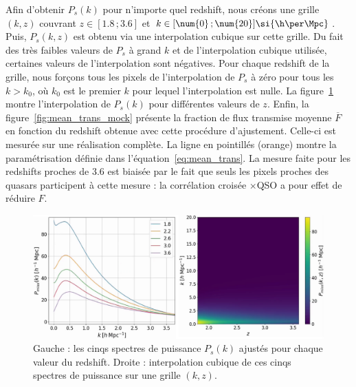 Afin d'obtenir $P_{s}(k)$ pour n'importe quel redshift, nous créons une grille $(k, z)$ couvrant $z \in [\num{1.8} \, ; \num{3.6}]$ et $k \in [\num{0} \, ; \num{20}] \si{\h\per\Mpc}$.
Puis, $P_{s}(k,z)$ est obtenu via une interpolation cubique sur cette grille. Du fait des très faibles valeurs de $P_{s}$ à grand $k$ et de l'interpolation cubique utilisée, certaines valeurs de l'interpolation sont négatives. Pour chaque redshift de la grille, nous forçons tous les pixels de l'interpolation de $P_{s}$ à zéro pour tous les $k > k_0$, où $k_0$ est le premier $k$ pour lequel l'interpolation est nulle. La figure~\ref{fig:p1dmiss} montre l'interpolation de $P_{s}(k)$ pour différentes valeurs de $z$.
Enfin, la figure~\ref{fig:mean_trans_mock} présente la fraction de flux transmise moyenne $\overline F$ en fonction du redshift obtenue avec cette procédure d'ajustement. Celle-ci est mesurée sur une réalisation complète. La ligne en pointillés (orange) montre la paramétrisation définie dans l'équation~\ref{eq:mean_trans}. La mesure faite pour les redshifts proches de \num{3.6} est biaisée par le fait que seuls les pixels proches des quasars participent à cette mesure : la corrélation croisée \lya{}$\times$QSO a pour effet de réduire $F$.
\begin{figure}
  \centering
  \includegraphics[scale=0.4]{p1dmiss}
  \caption{Gauche : les cinqs spectres de puissance $P_{s}(k)$ ajustés pour chaque valeur du redshift. Droite : interpolation cubique de ces cinqs spectres de puissance sur une grille $(k, z)$.}
  \label{fig:p1dmiss}
\end{figure}
